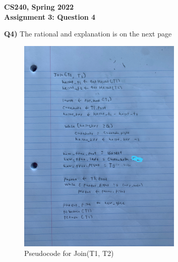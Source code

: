 \documentclass[12pt]{article}
\begin{document}
\begin{center}
{\Large\textbf{CS240, Spring 2022}}\\
\vspace{2mm}
{\Large\textbf{Assignment 3: Question 4}}\\
\vspace{3mm}
\end{center}
\begin{adjustwidth}{0em}{0pt}
\textbf{Q4)} The rational and explanation is on the next page
\begin{figure}[tbhp]
	\begin{center}
		\includegraphics[width=0.7\textwidth, angle=0]{1.jpg}
	\end{center}
    \caption{Pseudocode for Join(T1, T2)}
	\label{figcaption}
\end{figure}
\end{adjustwidth} 
\newpage
\end{document}

